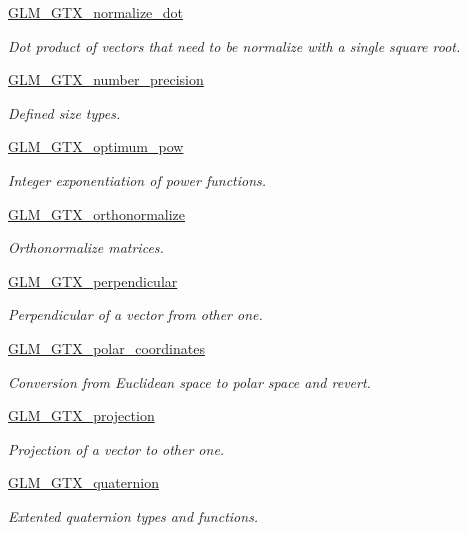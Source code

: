 \begin{DoxyCompactItemize}
\hyperlink{group__gtx__normalize__dot}{G\+L\+M\+\_\+\+G\+T\+X\+\_\+normalize\+\_\+dot}
\begin{DoxyCompactList}\small\item\em Dot product of vectors that need to be normalize with a single square root. \end{DoxyCompactList}\item 
\hyperlink{group__gtx__number__precision}{G\+L\+M\+\_\+\+G\+T\+X\+\_\+number\+\_\+precision}
\begin{DoxyCompactList}\small\item\em Defined size types. \end{DoxyCompactList}\item 
\hyperlink{group__gtx__optimum__pow}{G\+L\+M\+\_\+\+G\+T\+X\+\_\+optimum\+\_\+pow}
\begin{DoxyCompactList}\small\item\em Integer exponentiation of power functions. \end{DoxyCompactList}\item 
\hyperlink{group__gtx__orthonormalize}{G\+L\+M\+\_\+\+G\+T\+X\+\_\+orthonormalize}
\begin{DoxyCompactList}\small\item\em Orthonormalize matrices. \end{DoxyCompactList}\item 
\hyperlink{group__gtx__perpendicular}{G\+L\+M\+\_\+\+G\+T\+X\+\_\+perpendicular}
\begin{DoxyCompactList}\small\item\em Perpendicular of a vector from other one. \end{DoxyCompactList}\item 
\hyperlink{group__gtx__polar__coordinates}{G\+L\+M\+\_\+\+G\+T\+X\+\_\+polar\+\_\+coordinates}
\begin{DoxyCompactList}\small\item\em Conversion from Euclidean space to polar space and revert. \end{DoxyCompactList}\item 
\hyperlink{group__gtx__projection}{G\+L\+M\+\_\+\+G\+T\+X\+\_\+projection}
\begin{DoxyCompactList}\small\item\em Projection of a vector to other one. \end{DoxyCompactList}\item 
\hyperlink{group__gtx__quaternion}{G\+L\+M\+\_\+\+G\+T\+X\+\_\+quaternion}
\begin{DoxyCompactList}\small\item\em Extented quaternion types and functions. \end{DoxyCompactList}\item 

\end{DoxyCompactItemize}
